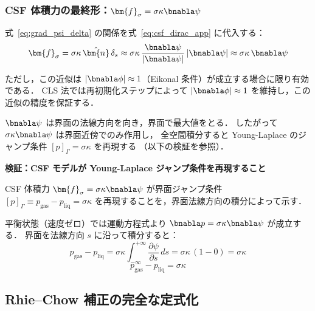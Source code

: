 \subsubsection{CSF 体積力の最終形：\texorpdfstring{$\bm{f}_\sigma = \sigma\kappa\bnabla\psi$}{f\_sigma = sigma*kappa*grad(psi)}}

式~\eqref{eq:grad_psi_delta} の関係を式~\eqref{eq:csf_dirac_app} に代入する：
\begin{equation}
  \bm{f}_\sigma = \sigma\kappa\,\hat{\bm{n}}\,\delta_s
  \approx \sigma\kappa\,\frac{\bnabla\psi}{|\bnabla\psi|}\,|\bnabla\psi|
  \approx \sigma\kappa\,\bnabla\psi
  \label{eq:csf_final}
\end{equation}

ただし，この近似は $|\bnabla\phi| \approx 1$（Eikonal 条件）が成立する場合に限り有効である．
CLS 法では再初期化ステップによって $|\bnabla\phi|\approx 1$ を維持し，この近似の精度を保証する．

$\bnabla\psi$ は界面の法線方向を向き，界面で最大値をとる．
したがって $\sigma\kappa\bnabla\psi$ は界面近傍でのみ作用し，
全空間積分すると Young-Laplace のジャンプ条件 $[p]_\Gamma = \sigma\kappa$ を再現する
（以下の検証を参照）．

\medskip
\noindent\textbf{検証：CSF モデルが Young-Laplace ジャンプ条件を再現すること}
\label{sec:csf_young_laplace_app}

CSF 体積力 $\bm{f}_\sigma = \sigma\kappa\bnabla\psi$ が界面ジャンプ条件
$[p]_\Gamma \equiv p_{\text{gas}} - p_{\text{liq}} = \sigma\kappa$
を再現することを，界面法線方向の積分によって示す．

平衡状態（速度ゼロ）では運動方程式より
$\bnabla p = \sigma\kappa\bnabla\psi$ が成立する．
界面を法線方向 $s$ に沿って積分すると：
\[
  p_{\text{gas}} - p_{\text{liq}}
  = \sigma\kappa \int_{-\infty}^{+\infty} \frac{\partial\psi}{\partial s}\,ds
  = \sigma\kappa\,(1 - 0) = \sigma\kappa
\]
\begin{equation}
  p_{\text{gas}} - p_{\text{liq}} = \sigma\kappa
  \label{eq:young-laplace-app}
\end{equation}

\subsection{Rhie--Chow 補正の完全な定式化}
\label{app:rhie_chow_full}

